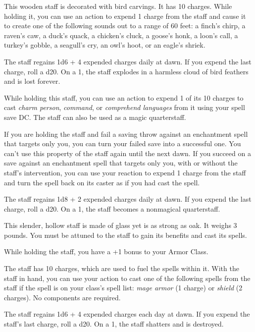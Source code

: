 \documentclass[10pt,a4paper,twoside,bg=print,twocolumn,openany,nodeprecatedcode]{dndbook}
\begin{document}
This wooden staff is decorated with bird carvings. It has 10 charges. While holding it, you can use an action to expend 1 charge from the staff and cause it to create one of the following sounds out to a range of 60 feet: a finch's chirp, a raven's caw, a duck's quack, a chicken's cluck, a goose's honk, a loon's call, a turkey's gobble, a seagull's cry, an owl's hoot, or an eagle's shriek.

The staff regains 1d6 + 4 expended charges daily at dawn. If you expend the last charge, roll a d20. On a 1, the staff explodes in a harmless cloud of bird feathers and is lost forever.

While holding this staff, you can use an action to expend 1 of its 10 charges to cast \textit{charm person}, \textit{command}, or \textit{comprehend languages} from it using your spell save DC. The staff can also be used as a magic quarterstaff.

If you are holding the staff and fail a saving throw against an enchantment spell that targets only you, you can turn your failed save into a successful one. You can't use this property of the staff again until the next dawn. If you succeed on a save against an enchantment spell that targets only you, with or without the staff's intervention, you can use your reaction to expend 1 charge from the staff and turn the spell back on its caster as if you had cast the spell.

The staff regains 1d8 + 2 expended charges daily at dawn. If you expend the last charge, roll a d20. On a 1, the staff becomes a nonmagical quarterstaff.

This slender, hollow staff is made of glass yet is as strong as oak. It weighs 3 pounds. You must be attuned to the staff to gain its benefits and cast its spells.

While holding the staff, you have a +1 bonus to your Armor Class.

The staff has 10 charges, which are used to fuel the spells within it. With the staff in hand, you can use your action to cast one of the following spells from the staff if the spell is on your class's spell list: \textit{mage armor} (1 charge) or \textit{shield} (2 charges). No components are required.

The staff regains 1d6 + 4 expended charges each day at dawn. If you expend the staff's last charge, roll a d20. On a 1, the staff shatters and is destroyed.
\end{document}
